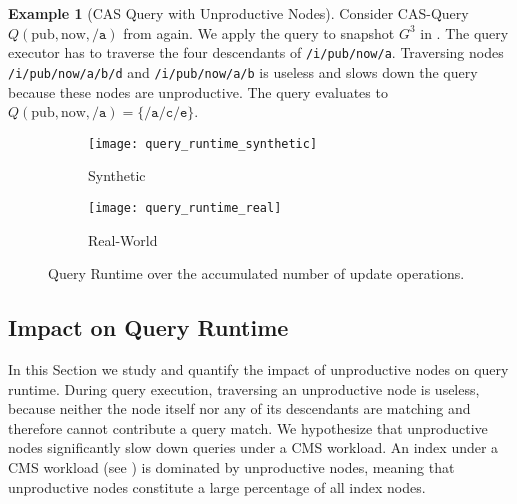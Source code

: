 \documentclass[abstracton,12pt]{scrartcl}
\theoremstyle{definition}
\newtheorem{example}{Example}
\begin{document}
\begin{example}[CAS Query with Unproductive Nodes]
  Consider CAS-Query $Q(\text{pub},\text{now},\texttt{/a})$ from
   again. We apply the query to snapshot $G^3$ in
  . The query executor has to traverse the four
  descendants of \texttt{/i/pub/now/a}. Traversing nodes
  \texttt{/i/pub/now/a/b/d} and \texttt{/i/pub/now/a/b} is useless and slows down the
  query because these nodes are unproductive. The query evaluates to
  $Q(\text{pub},\text{now},\texttt{/a}) = \{\texttt{/a/c/e}\}$.
\end{example}

\newpage

\begin{figure}[t]
  \centering
  \begin{subfigure}{0.49\linewidth}
    \centering
    \caption{Synthetic}
    \texttt{[image: query\_runtime\_synthetic]}
    \label{fig:query_runtime_synthetic}
  \end{subfigure}
  \begin{subfigure}{0.49\linewidth}
    \centering
    \caption{Real-World}
    \texttt{[image: query\_runtime\_real]}
    \label{fig:query_runtime_real}
  \end{subfigure}
  \vspace{-0.65cm}
  \caption[Query Runtime over the accumulated number of update operations]{
  Query Runtime over the accumulated number of update operations.}
  \label{fig:query_runtime}
\end{figure}


\subsection{Impact on Query Runtime}

\label{sec:query-runtime}

In this Section we study and quantify the impact of unproductive nodes on
query runtime. During query execution, traversing an unproductive node is
useless, because neither the node itself nor any of its descendants are matching
and therefore cannot contribute a query match. We hypothesize that unproductive nodes
significantly slow down queries under a CMS workload.
An index under a CMS workload (see ) is dominated
by unproductive nodes, meaning that unproductive nodes constitute a large percentage
of all index nodes.
\end{document}
